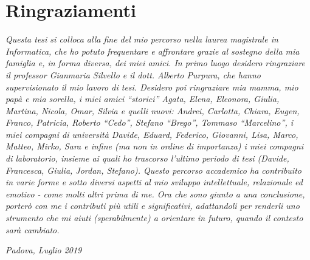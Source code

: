 \cleardoublepage
{}
\thispagestyle{empty}


\begingroup
\let\clearpage\relax
\let\cleardoublepage\relax
\let\cleardoublepage\relax

\section*{Ringraziamenti}

\noindent \textit{Questa tesi si colloca alla fine del mio percorso nella laurea magistrale in Informatica, che ho potuto frequentare e affrontare grazie al sostegno della mia famiglia e, in forma diversa, dei miei amici.
In primo luogo desidero ringraziare il professor Gianmaria Silvello e il dott. Alberto Purpura, che hanno supervisionato il mio lavoro di tesi.
Desidero poi ringraziare mia mamma, mio papà e mia sorella, i miei amici ``storici'' Agata, Elena, Eleonora, Giulia, Martina, Nicola, Omar, Silvia e quelli nuovi: Andrei, Carlotta, Chiara, Eugen, Franco, Patricia, Roberto ``Cedo'', Stefano ``Brego'', Tommaso ``Marcelino'', i miei compagni di università Davide, Eduard, Federico, Giovanni, Lisa, Marco, Matteo, Mirko, Sara e infine (ma non in ordine di importanza) i miei compagni di laboratorio, insieme ai quali ho trascorso l'ultimo periodo di tesi (Davide, Francesca, Giulia, Jordan, Stefano).
Questo percorso accademico ha contribuito in varie forme e sotto diversi aspetti al mio sviluppo intellettuale, relazionale ed emotivo - come molti altri prima di me. Ora che sono giunto a una conclusione, porterò con me i contributi più utili e significativi, adattandoli per renderli uno strumento che mi aiuti (sperabilmente) a orientare in futuro, quando il contesto sarà cambiato.}\\
\bigskip

\noindent\textit{Padova, Luglio 2019}
\hfill \myName

\endgroup
